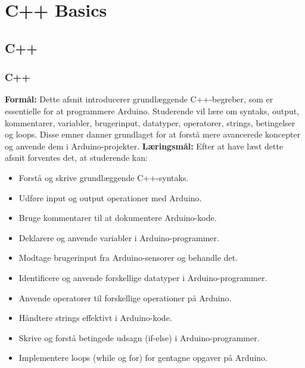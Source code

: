 \part{C++ Basics}
\chapter{C++}
\section{C++ }
\textbf{Formål:} Dette afsnit introducerer grundlæggende C++-begreber, som er essentielle for at programmere Arduino. Studerende vil lære om syntaks, output, kommentarer, variabler, brugerinput, datatyper, operatorer, strings, betingelser og loops. Disse emner danner grundlaget for at forstå mere avancerede koncepter og anvende dem i Arduino-projekter.
\newline\newline
\noindent\textbf{Læringsmål:} Efter at have læst dette afsnit forventes det, at studerende kan:
\begin{itemize}
	\item Forstå og skrive grundlæggende C++-syntaks.
	\item Udføre input og output operationer med Arduino.
	\item Bruge kommentarer til at dokumentere Arduino-kode.
	\item Deklarere og anvende variabler i Arduino-programmer.
	\item Modtage brugerinput fra Arduino-sensorer og behandle det.
	\item Identificere og anvende forskellige datatyper i Arduino-programmer.
	\item Anvende operatorer til forskellige operationer på Arduino.
	\item Håndtere strings effektivt i Arduino-kode.
	\item Skrive og forstå betingede udsagn (if-else) i Arduino-programmer.
	\item Implementere loops (while og for) for gentagne opgaver på Arduino.
\end{itemize}


